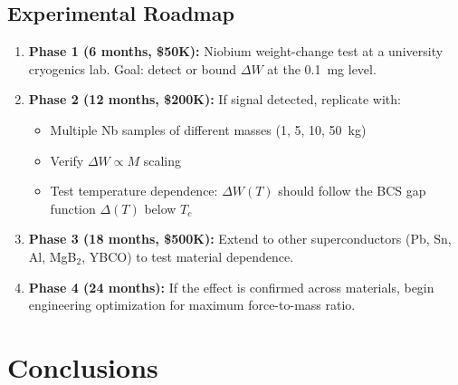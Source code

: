 \documentclass[12pt,a4paper]{article}
\theoremstyle{definition}
\theoremstyle{remark}
\begin{document}
\subsection{Experimental Roadmap}

\begin{enumerate}
\item \textbf{Phase 1 (6 months, \$50K):} Niobium weight-change test at a
university cryogenics lab.  Goal: detect or bound $\Delta W$ at the 0.1~mg level.

\item \textbf{Phase 2 (12 months, \$200K):} If signal detected, replicate with:
\begin{itemize}
\item Multiple Nb samples of different masses (1, 5, 10, 50~kg)
\item Verify $\Delta W \propto M$ scaling
\item Test temperature dependence: $\Delta W(T)$ should follow the BCS gap
function $\Delta(T)$ below $T_c$
\end{itemize}

\item \textbf{Phase 3 (18 months, \$500K):} Extend to other superconductors
(Pb, Sn, Al, MgB$_2$, YBCO) to test material dependence.

\item \textbf{Phase 4 (24 months):} If the effect is confirmed across materials,
begin engineering optimization for maximum force-to-mass ratio.
\end{enumerate}

\section{Conclusions}\label{sec:conclusions}
\end{document}
